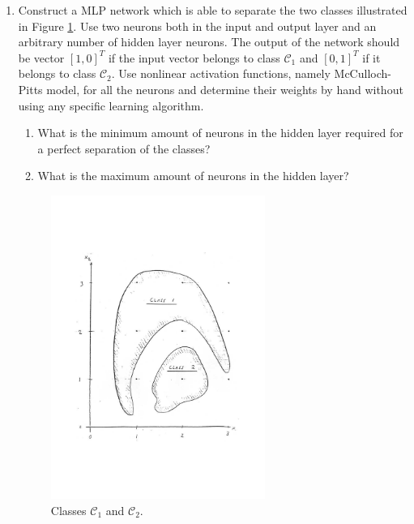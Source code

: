 \begin{enumerate}

\item Construct a MLP network which is able to separate the two
  classes illustrated in Figure \ref{fig:mlp_classify}. Use two neurons both in the input
  and output layer and an arbitrary number of hidden layer
  neurons. The output of the network should be vector $\left[ 1,
    0\right]^T$ if the input vector belongs to class $\mathcal{C}_1$ and  $\left[ 0,
    1\right]^T$ if it belongs to class $\mathcal{C}_2$. Use nonlinear activation
  functions, namely McCulloch-Pitts model, for all the neurons and
  determine their weights by hand without using any specific learning
  algorithm.
  \begin{enumerate}
  \item What is the minimum amount of neurons in the hidden layer
    required for a perfect separation of the classes?
  \item What is the maximum amount of neurons in the hidden layer?
  \end{enumerate}

  \begin{figure}[hbp]
    \centering
    \includegraphics[width=7cm]{mlp_classification}
    \caption{Classes $\mathcal{C}_1$ and $\mathcal{C}_2$.}
    \label{fig:mlp_classify}
  \end{figure}

  \begin{solution}


\end{solution}
\end{enumerate}

